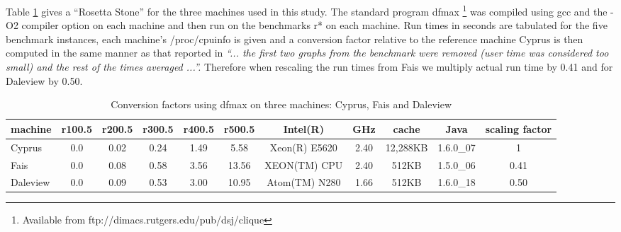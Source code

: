 \documentclass[runningheads]{llncs}
\begin{document}
Table \ref{rosettaStone} gives a ``Rosetta Stone'' for the three machines used in this study.
The standard program dfmax \footnote{Available from ftp://dimacs.rutgers.edu/pub/dsj/clique} was compiled using 
gcc and the -O2 compiler option on each machine and then run
on the benchmarks r* on each machine. Run times in seconds are tabulated for the five benchmark instances,
each machine's /proc/cpuinfo is given and a conversion factor relative to the reference machine Cyprus
is then computed in the same manner as that reported in
\cite{segundo2011} \emph{``... the first two graphs from the benchmark were removed (user time was considered too small) and the rest
of the times averaged ...''.}  Therefore when rescaling the run times from Fais we
multiply actual run time by 0.41 and for Daleview by 0.50.

\begin{table}
\begin{center}
\begin{scriptsize}
\begin{tabular}{|l|c|c|c|c|c|c|c|c|c|c|} \hline 
machine & r100.5 & r200.5 & r300.5 & r400.5 & r500.5 & Intel(R) & GHz & cache & Java & scaling factor\\ \hline
Cyprus & 0.0 & 0.02 & 0.24 & 1.49 & 5.58 & Xeon(R) E5620 & 2.40 & 12,288KB & 1.6.0\_07 & 1 \\ \hline
Fais & 0.0 & 0.08 & 0.58 & 3.56 & 13.56 & XEON(TM) CPU & 2.40& 512KB & 1.5.0\_06 & 0.41 \\ \hline
Daleview & 0.0 & 0.09 & 0.53 & 3.00 & 10.95 & Atom(TM) N280 & 1.66 & 512KB & 1.6.0\_18 & 0.50 \\ \hline
\end{tabular}
\end{scriptsize}
\end{center}
\caption{Conversion factors using dfmax on three machines: Cyprus, Fais and Daleview}
\label{rosettaStone}
\end{table}
\end{document}
